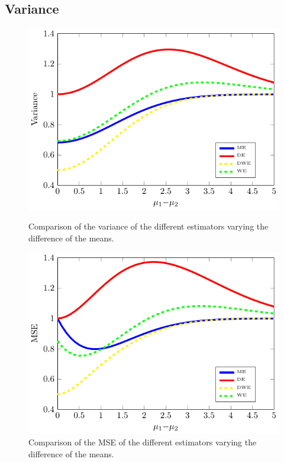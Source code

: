 \subsection{Variance}
\begin{figure}
\centering
	\begin{minipage}{0.45\textwidth}
	\centering
	\includegraphics[scale=0.7]{./img/variance.pdf}
    \caption[Variance analysis in WE]{Comparison of the variance of the different estimators varying the difference of the means.}\label{F:variance}
	\end{minipage}
	  \hfill
	\begin{minipage}{0.45\textwidth}
	\centering	
	\includegraphics[scale=0.7]{./img/mse.pdf}
	\caption[MSE analysis in WE]{Comparison of the MSE of the different estimators varying the difference of the means.}\label{F:mse}
	\end{minipage}
	\label{F:Variance_mse}
\end{figure}

